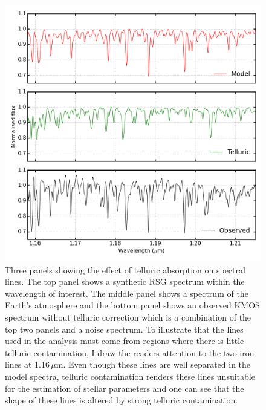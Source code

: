 \begin{figure}
 \centering
\includegraphics[width=\textwidth]{JAnal/tell-correction}
\caption[Three panels showing the effect of telluric absorption on spectral lines]{
Three panels showing the effect of telluric absorption on spectral lines.
The top panel shows a synthetic RSG spectrum within the wavelength of interest.
The middle panel shows a spectrum of the Earth's atmosphere and
the bottom panel shows an observed KMOS spectrum without telluric correction which is a combination of the top two panels and a noise spectrum.
To illustrate that the lines used in the analysis must come from regions where there is little telluric contamination, I draw the readers attention to the two iron lines at 1.16\,$\mu$m.
Even though these lines are well separated in the model spectra, telluric contamination renders these lines unsuitable for the estimation of  stellar parameters and one can see that the shape of these lines is altered by strong telluric contamination.
\label{fig:tell3pan}
         }
\end{figure}


